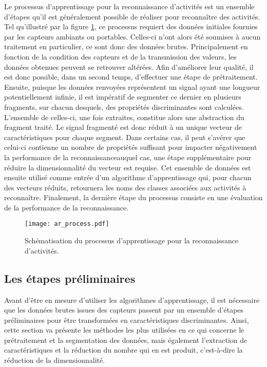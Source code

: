 Le processus d'apprentissage pour la reconnaissance d'activités est un ensemble d'étapes qu'il est généralement possible de réaliser pour reconnaître des activités. Tel qu'illustré par la figure \ref{fig:ar_process}, ce processus requiert des données initiales fournies par les capteurs ambiants ou portables. Celles-ci n'ont alors été soumises à aucun traitement en particulier, ce sont donc des données brutes. Principalement en fonction de la condition des capteurs et de la transmission des valeurs, les données obtenues peuvent se retrouver altérées. Afin d'améliorer leur qualité, il est donc possible, dans un second temps, d'effectuer une étape de prétraitement. Ensuite, puisque les données renvoyées représentent un signal ayant une longueur potentiellement infinie, il est impératif de segmenter ce dernier en plusieurs fragments, sur chacun desquels, des propriétés discriminantes sont calculées. L'ensemble de celles-ci, une fois extraites, constitue alors une abstraction du fragment traité. Le signal fragmenté est donc réduit à un unique vecteur de caractéristiques pour chaque segment. Dans certains cas, il peut s'avérer que celui-ci contienne un nombre de propriétés suffisant pour impacter négativement la performance de la reconnaissance\textemdash auquel cas, une étape supplémentaire pour réduire la dimensionnalité du vecteur est requise. Cet ensemble de données est ensuite utilisé comme entrée d'un algorithme d'apprentissage qui, pour chacun des vecteurs réduits, retournera les noms des classes associées aux activités à reconnaître. Finalement, la dernière étape du processus consiste en une évaluation de la performance de la reconnaissance.

\begin{figure}[H]
	\centering
	\texttt{[image: ar\_process.pdf]}
	\caption{Schématisation du processus d'apprentissage pour la reconnaissance d'activités.}
	\label{fig:ar_process}
\end{figure}

\subsection{Les étapes préliminaires}
\label{sec:prel_steps}

Avant d'être en mesure d'utiliser les algorithmes d'apprentissage, il est nécessaire que les données brutes issues des capteurs passent par un ensemble d'étapes préliminaires pour être transformées en caractéristiques discriminantes. Ainsi, cette section va présente les méthodes les plus utilisées en ce qui concerne le prétraitement et la segmentation des données, mais également l'extraction de caractéristiques et la réduction du nombre qui en est produit, c'est-à-dire la réduction de la dimensionnalité.

